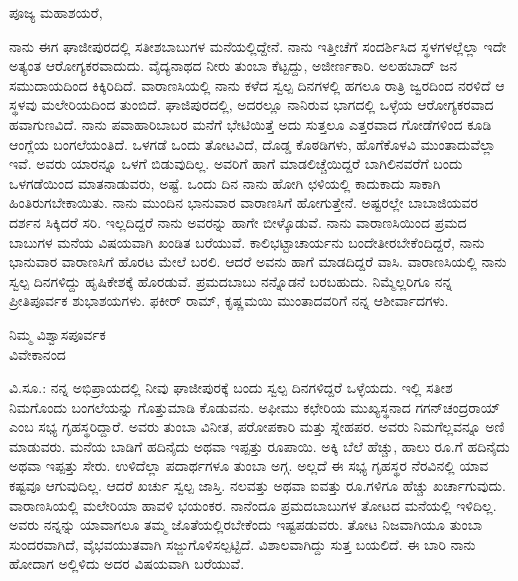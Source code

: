 \vspace{-0.55cm}

\begin{flushright}
{\fontsize{12pt}{11.5pt}\selectfont{ಘಾಜೀಪುರ\\[-2pt] ೩೦ನೇ ಜನವರಿ ೧೮೯೦}}
\end{flushright}
\vspace{-0.4cm}

\noindent
ಪೂಜ್ಯ ಮಹಾಶಯರೆ,

ನಾನು ಈಗ ಘಾಜೀಪುರದಲ್ಲಿ ಸತೀಶಬಾಬುಗಳ ಮನೆಯಲ್ಲಿದ್ದೇನೆ. ನಾನು ಇತ್ತೀಚೆಗೆ ಸಂದರ್ಶಿಸಿದ ಸ್ಥಳಗಳಲ್ಲೆಲ್ಲಾ ಇದೇ ಅತ್ಯಂತ ಆರೋಗ್ಯಕರವಾದುದು. ವೈದ್ಯನಾಥದ ನೀರು ತುಂಬಾ ಕೆಟ್ಟದ್ದು, ಅಜೀರ್ಣಕಾರಿ. ಅಲಹಬಾದ್ ಜನ ಸಮುದಾಯದಿಂದ ಕಿಕ್ಕಿರಿದಿದೆ. ವಾರಾಣಸಿಯಲ್ಲಿ ನಾನು ಕಳೆದ ಸ್ವಲ್ಪ ದಿನಗಳಲ್ಲಿ ಹಗಲೂ ರಾತ್ರಿ ಜ್ವರದಿಂದ ನರಳಿದೆ \enginline{-} ಆ ಸ್ಥಳವು ಮಲೇರಿಯದಿಂದ ತುಂಬಿದೆ. ಘಾಜಿಪುರದಲ್ಲಿ, ಅದರಲ್ಲೂ ನಾನಿರುವ ಭಾಗದಲ್ಲಿ ಒಳ್ಳೆಯ ಆರೋಗ್ಯಕರವಾದ ಹವಾಗುಣವಿದೆ. ನಾನು ಪವಾಹಾರಿಬಾಬರ ಮನೆಗೆ ಭೇಟಿಯಿತ್ತೆ \enginline{-} ಅದು ಸುತ್ತಲೂ ಎತ್ತರವಾದ ಗೋಡೆಗಳಿಂದ ಕೂಡಿ ಆಂಗ್ಲೆಯ ಬಂಗಲೆಯಂತಿದೆ. ಒಳಗಡೆ ಒಂದು ತೋಟವಿದೆ, ದೊಡ್ಡ ಕೊಠಡಿಗಳು, ಹೊಗೆಕೊಳವಿ ಮುಂತಾದುವೆಲ್ಲಾ ಇವೆ. ಅವರು ಯಾರನ್ನೂ ಒಳಗೆ ಬಿಡುವುದಿಲ್ಲ. ಅವರಿಗೆ ಹಾಗೆ ಮಾಡಲಿಚ್ಚೆಯಿದ್ದರೆ ಬಾಗಿಲಿನವರೆಗೆ ಬಂದು ಒಳಗಡೆಯಿಂದ ಮಾತನಾಡುವರು, ಅಷ್ಟೆ. ಒಂದು ದಿನ ನಾನು ಹೋಗಿ ಛಳಿಯಲ್ಲಿ ಕಾದುಕಾದು ಸಾಕಾಗಿ ಹಿಂತಿರುಗಬೇಕಾಯಿತು. ನಾನು ಮುಂದಿನ ಭಾನುವಾರ ವಾರಾಣಸಿಗೆ ಹೋಗುತ್ತೇನೆ. ಅಷ್ಟರಲ್ಲೇ ಬಾಬಾಜಿಯವರ ದರ್ಶನ ಸಿಕ್ಕಿದರೆ ಸರಿ. ಇಲ್ಲದಿದ್ದರೆ ನಾನು ಅವರನ್ನು ಹಾಗೇ ಬೀಳ್ಕೊಡುವೆ. ನಾನು ವಾರಾಣಸಿಯಿಂದ ಪ್ರಮದ ಬಾಬುಗಳ ಮನೆಯ ವಿಷಯವಾಗಿ ಖಂಡಿತ ಬರೆಯುವೆ. ಕಾಲಿಭಟ್ಟಾಚಾರ್ಯನು ಬಂದೇತೀರಬೇಕೆಂದಿದ್ದರೆ, ನಾನು ಭಾನುವಾರ ವಾರಾಣಸಿಗೆ ಹೊರಟ ಮೇಲೆ ಬರಲಿ. ಆದರೆ ಅವನು ಹಾಗೆ ಮಾಡದಿದ್ದರೆ ವಾಸಿ. ವಾರಾಣಸಿಯಲ್ಲಿ ನಾನು ಸ್ವಲ್ಪ ದಿನಗಳಿದ್ದು ಹೃಷಿಕೇಶಕ್ಕೆ ಹೊರಡುವೆ. ಪ್ರಮದಬಾಬು ನನ್ನೊಡನೆ ಬರಬಹುದು. ನಿಮ್ಮೆಲ್ಲರಿಗೂ ನನ್ನ ಪ್ರೀತಿಪೂರ್ವಕ ಶುಭಾಶಯಗಳು. ಫಕೀರ್ ರಾಮ್, ಕೃಷ್ಣಮಯಿ ಮುಂತಾದವರಿಗೆ ನನ್ನ ಆಶೀರ್ವಾದಗಳು.

\vspace{-0.47cm}

\begin{flushright}
ನಿಮ್ಮ ವಿಶ್ವಾಸಪೂರ್ವಕ\\ವಿವೇಕಾನಂದ
\end{flushright}

\vspace{-0.25cm}

ವಿ.ಸೂ.:\enginline{-} ನನ್ನ ಅಭಿಪ್ರಾಯದಲ್ಲಿ ನೀವು ಘಾಜೀಪುರಕ್ಕೆ ಬಂದು ಸ್ವಲ್ಪ ದಿನಗಳಿದ್ದರೆ ಒಳ್ಳೆಯದು. ಇಲ್ಲಿ ಸತೀಶ ನಿಮಗೊಂದು ಬಂಗಲೆಯನ್ನು ಗೊತ್ತುಮಾಡಿ ಕೊಡುವನು. ಅಫೀಮು ಕಛೇರಿಯ ಮುಖ್ಯಸ್ಥನಾದ ಗಗನ್‌ಚಂದ್ರರಾಯ್ ಎಂಬ ಸಭ್ಯ ಗೃಹಸ್ಥರಿದ್ದಾರೆ. ಅವರು ತುಂಬಾ ವಿನೀತ, ಪರೋಪಕಾರಿ ಮತ್ತು ಸ್ನೇಹಪರ. ಅವರು ನಿಮಗೆಲ್ಲವನ್ನೂ ಅಣಿ ಮಾಡುವರು. ಮನೆಯ ಬಾಡಿಗೆ ಹದಿನೈದು ಅಥವಾ ಇಪ್ಪತ್ತು ರೂಪಾಯಿ. ಅಕ್ಕಿ ಬೆಲೆ ಹೆಚ್ಚು, ಹಾಲು ರೂ.ಗೆ ಹದಿನೈದು ಅಥವಾ ಇಪ್ಪತ್ತು ಸೇರು. ಉಳಿದೆಲ್ಲಾ ಪದಾರ್ಥಗಳೂ ತುಂಬಾ ಅಗ್ಗ. ಅಲ್ಲದೆ ಈ ಸಭ್ಯ ಗೃಹಸ್ಥರ ನೆರವಿನಲ್ಲಿ ಯಾವ ಕಷ್ಟವೂ ಆಗುವುದಿಲ್ಲ. ಆದರೆ ಖರ್ಚು ಸ್ವಲ್ಪ ಜಾಸ್ತಿ. ನಲವತ್ತು ಅಥವಾ ಐವತ್ತು ರೂ.ಗಳಿಗೂ ಹೆಚ್ಚು ಖರ್ಚಾಗುವುದು. ವಾರಾಣಸಿಯಲ್ಲಿ ಮಲೇರಿಯಾ ಹಾವಳಿ ಭಯಂಕರ. ನಾನೆಂದೂ ಪ್ರಮದಬಾಬುಗಳ ತೋಟದ ಮನೆಯಲ್ಲಿ ಇಳಿದಿಲ್ಲ. ಅವರು ನನ್ನನ್ನು ಯಾವಾಗಲೂ ತಮ್ಮ ಜೊತೆಯಲ್ಲಿರಬೇಕೆಂದು ಇಷ್ಟಪಡುವರು. ತೋಟ ನಿಜವಾಗಿಯೂ ತುಂಬಾ ಸುಂದರವಾಗಿದೆ, ವೈಭವಯುತವಾಗಿ ಸಜ್ಜುಗೊಳಿಸಲ್ಪಟ್ಟಿದೆ. ವಿಶಾಲವಾಗಿದ್ದು ಸುತ್ತ ಬಯಲಿದೆ. ಈ ಬಾರಿ ನಾನು ಹೋದಾಗ ಅಲ್ಲಿಳಿದು ಅದರ ವಿಷಯವಾಗಿ ಬರೆಯುವೆ.

